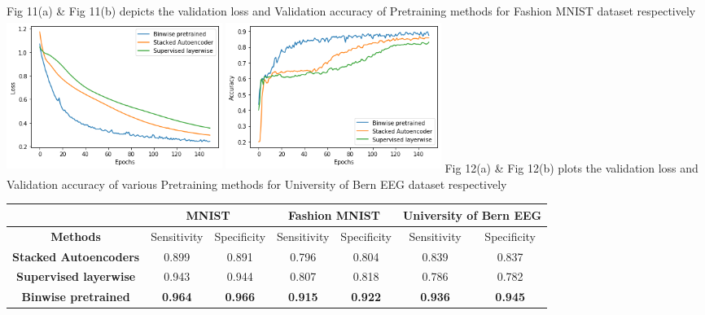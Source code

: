 \documentclass{article}
\begin{document}
\\
Fig 11(a) \& Fig 11(b) depicts the validation loss and Validation accuracy of Pretraining methods for Fashion MNIST dataset respectively
\\
\includegraphics[width= 7cm, height=5cm]{fig11.png}
\includegraphics[width= 7cm, height=5cm]{fig12.png}
Fig 12(a) \& Fig 12(b) plots the validation loss and Validation accuracy of various Pretraining methods for University of Bern EEG dataset respectively
\begin{table}
	\begin{tabular}{c|c|c|c|c|c|c|}
		\cline{2-7}
		& \multicolumn{2}{c|}{\textbf{MNIST}} & \multicolumn{2}{c|}{\textbf{Fashion MNIST}} & \multicolumn{2}{c|}{\textbf{University of Bern EEG}} \\ \hline
		\multicolumn{1}{|c|}{\textbf{Methods}}              & Sensitivity      & Specificity      & Sensitivity          & Specificity          & Sensitivity               & Specificity              \\ \hline
		\multicolumn{1}{|c|}{\textbf{Stacked Autoencoders}} & 0.899            & 0.891            & 0.796                & 0.804                & 0.839                     & 0.837                    \\ \hline
		\multicolumn{1}{|c|}{\textbf{Supervised layerwise}} & 0.943            & 0.944            & 0.807                & 0.818                & 0.786                     & 0.782                    \\ \hline
		\multicolumn{1}{|c|}{\textbf{Binwise pretrained}}   & \textbf{0.964}   & \textbf{0.966}   & \textbf{0.915}       & \textbf{0.922}       & \textbf{0.936}            & \textbf{0.945}           \\ \hline
	\end{tabular}
\end{table}
\end{document}
